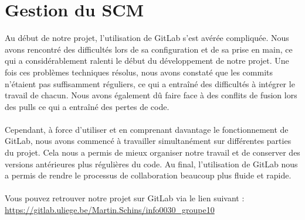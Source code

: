 
\section{Gestion du SCM}

Au début de notre projet, l'utilisation de GitLab s'est avérée compliquée. Nous avons rencontré des difficultés lors de sa configuration et de sa prise en main, ce qui a considérablement ralenti le début du développement de notre projet. Une fois ces problèmes techniques résolus, nous avons constaté que les commits n'étaient pas suffisamment réguliers, ce qui a entraîné des difficultés à intégrer le travail de chacun. Nous avons également dû faire face à des conflits de fusion lors des pulls ce qui a entraîné des pertes de code.
\\\\
Cependant, à force d'utiliser et en comprenant davantage le fonctionnement de GitLab, nous avons commencé à travailler simultanément sur différentes parties du projet. Cela nous a permis de mieux organiser notre travail et de conserver des versions antérieures plus régulières du code. Au final, l'utilisation de GitLab nous a permis de rendre le processus de collaboration beaucoup plus fluide et rapide.
\\\\
Vous pouvez retrouver notre projet sur GitLab via le lien suivant :\\ \url{https://gitlab.uliege.be/Martin.Schins/info0030_groupe10}